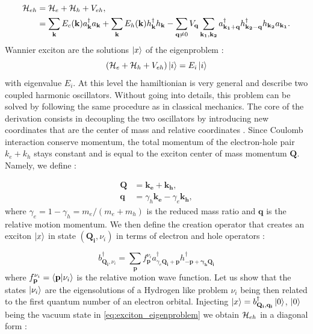\begin{equation}
    \begin{align}
    \mathcal{H}_{eh} &= \mathcal{H}_e + \mathcal{H}_h + V_{eh}, \\
              &= \sum_{\mathbf{k}}E_c(\mathbf{k}) a^{\dagger}_{\mathbf{k}}a_{\mathbf{k}} + \sum_{\mathbf{k}}E_h(\mathbf{k}) h^{\dagger}_{\mathbf{k}}h_{\mathbf{k}} - \sum_{\textbf{q}\neq 0}V_{\mathbf{q}} \sum_{\mathbf{k_{1}, k_{2}}} a^{\dagger}_{\mathbf{k_1+q}}h^{\dagger}_{\mathbf{k_2-q}}h_{\mathbf{k_2}}a_{\mathbf{k_1}}.
    \label{eq:electron_hole_hamiltonian}
    \end{align}
\end{equation}
Wannier exciton are the solutions $\ket{x}$ of the eigenproblem :
\begin{equation}
    (\mathcal{H}_e + \mathcal{H}_h + V_{eh})\ket{i}= E_i\ket{i}
    \label{eq:exciton_eigenproblem}
\end{equation}
with eigenvalue $E_i$.
At this level the hamiltionian is very general and describe two coupled harmonic oscillators. Without going into details, this problem can be solved by following the same procedure as in classical mechanics.
The core of the derivation consists in decoupling the two oscillators by introducing new coordinates that are the center of mass and relative coordinates \cite{Combescot_cooper_excitons_2015, opt_prop_solids}. Since Coulomb interaction conserve momentum, the total momentum of the
electron-hole pair $k_e+k_h$ stays constant and is equal to the exciton center of mass momentum $\mathbf{Q}$. Namely, we define :

\begin{subequations}
    \begin{align}
        \mathbf{Q} &= \mathbf{k_e} + \mathbf{k_h}, \\
        \mathbf{q} &= \gamma_h\mathbf{k_e} - \gamma_e\mathbf{k_h},
    \end{align}
\end{subequations}
where $\gamma_e =1- \gamma_h= m_e/(m_e+m_h)$ is the reduced mass ratio and $\mathbf{q}$ is the relative motion momentum. We then define the creation operator that creates an exciton $\ket{x}$ in state $(\mathbf{Q_i}, \nu_i)$ in terms of electron and hole operators : 

\begin{equation}
    b^{\dagger}_{\mathbf{Q_i},\nu_i} =  \sum_{\mathbf{p}}f_{\mathbf{p}}^{\nu_i}a^{\dagger}_{\gamma_e\mathbf{Q_i}+\mathbf{p}}h^{\dagger}_{\mathbf{-p+\gamma_h\mathbf{Q_i}}}
\end{equation}
where $f_{\mathbf{p}}^{\nu_i} = \bra{\mathbf{p}}\ket{\nu_i}$ is the relative motion wave function. Let us show that the states $\ket{\nu_i}$ are the eigensolutions of a Hydrogen like problem $\nu_i$ being then related to the first quantum number of an electron orbital. Injecting $\ket{x}= b^{\dagger}_{\mathbf{Q_i},\mathbf{q_i}}\ket{0}$, $\ket{0}$ being the vacuum state in 
\autoref{eq:exciton_eigenproblem} we obtain $\mathcal{H}_{eh}$ in a diagonal form :


